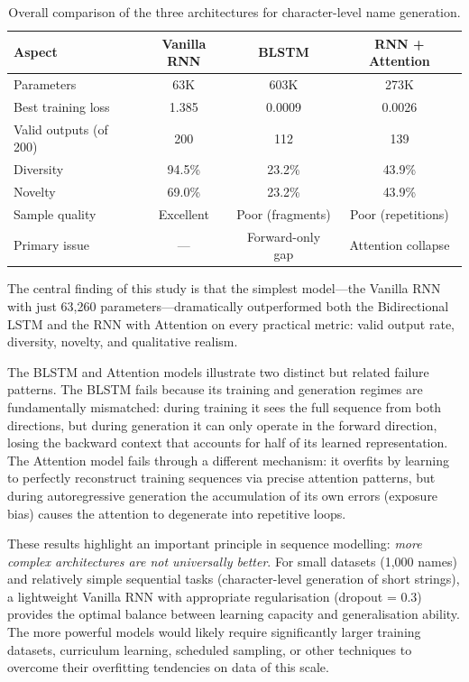 \documentclass[12pt, a4paper]{article}
\begin{document}
\begin{table}[H]
\centering
\caption{Overall comparison of the three architectures for character-level name generation.}
\label{tab:rnn_summary}
\small
\begin{tabular}{lccc}
\toprule
\textbf{Aspect} & \textbf{Vanilla RNN} & \textbf{BLSTM} & \textbf{RNN + Attention} \\
\midrule
Parameters          & 63K      & 603K     & 273K \\
Best training loss  & 1.385    & 0.0009   & 0.0026 \\
Valid outputs (of 200) & 200   & 112      & 139 \\
Diversity           & 94.5\%   & 23.2\%   & 43.9\% \\
Novelty             & 69.0\%   & 23.2\%   & 43.9\% \\
Sample quality      & Excellent & Poor (fragments) & Poor (repetitions) \\
Primary issue       & ---      & Forward-only gap & Attention collapse \\
\bottomrule
\end{tabular}
\end{table}

The central finding of this study is that the simplest model---the Vanilla RNN with just 63,260 parameters---dramatically outperformed both the Bidirectional LSTM and the RNN with Attention on every practical metric: valid output rate, diversity, novelty, and qualitative realism.

The BLSTM and Attention models illustrate two distinct but related failure patterns. The BLSTM fails because its training and generation regimes are fundamentally mismatched: during training it sees the full sequence from both directions, but during generation it can only operate in the forward direction, losing the backward context that accounts for half of its learned representation. The Attention model fails through a different mechanism: it overfits by learning to perfectly reconstruct training sequences via precise attention patterns, but during autoregressive generation the accumulation of its own errors (exposure bias) causes the attention to degenerate into repetitive loops.

These results highlight an important principle in sequence modelling: \emph{more complex architectures are not universally better}. For small datasets (1,000 names) and relatively simple sequential tasks (character-level generation of short strings), a lightweight Vanilla RNN with appropriate regularisation (dropout = 0.3) provides the optimal balance between learning capacity and generalisation ability. The more powerful models would likely require significantly larger training datasets, curriculum learning, scheduled sampling, or other techniques to overcome their overfitting tendencies on data of this scale.
\end{document}
